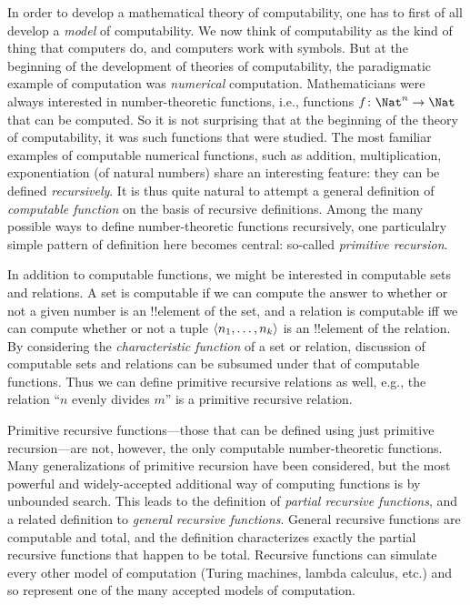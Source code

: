 \documentclass[../../include/open-logic-section]{subfiles}
\begin{document}

In order to develop a mathematical theory of computability, one has to
first of all develop a \emph{model} of computability.  We now think of
computability as the kind of thing that computers do, and computers
work with symbols.  But at the beginning of the development of
theories of computability, the paradigmatic example of computation was
\emph{numerical} computation.  Mathematicians were always interested
in number-theoretic functions, i.e., functions $f\colon \Nat^n \to
\Nat$ that can be computed. So it is not surprising that at the
beginning of the theory of computability, it was such functions that
were studied.  The most familiar examples of computable numerical
functions, such as addition, multiplication, exponentiation (of
natural numbers) share an interesting feature: they can be defined
\emph{recursively}.  It is thus quite natural to attempt a general
definition of \emph{computable function} on the basis of recursive
definitions.  Among the many possible ways to define number-theoretic
functions recursively, one particulalry simple pattern of definition
here becomes central: so-called \emph{primitive recursion}.

In addition to computable functions, we might be interested in
computable sets and relations. A set is computable if we can compute
the answer to whether or not a given number is an !!{element} of the
set, and a relation is computable iff we can compute whether or not a
tuple $\langle n_1, \dots, n_k \rangle$ is an !!{element} of the relation.  By
considering the \emph{characteristic function} of a set or relation,
discussion of computable sets and relations can be subsumed under that
of computable functions.  Thus we can define primitive recursive
relations as well, e.g., the relation ``$n$ evenly divides $m$'' is a
primitive recursive relation.

Primitive recursive functions---those that can be defined using just
primitive recursion---are not, however, the only computable
number-theoretic functions. Many generalizations of primitive
recursion have been considered, but the most powerful and
widely-accepted additional way of computing functions is by unbounded
search.  This leads to the definition of \emph{partial recursive
  functions}, and a related definition to \emph{general recursive
  functions}.  General recursive functions are computable and total,
and the definition characterizes exactly the partial recursive
functions that happen to be total.  Recursive functions can simulate
every other model of computation (Turing machines, lambda calculus,
etc.) and so represent one of the many accepted models of computation.
\end{document}
